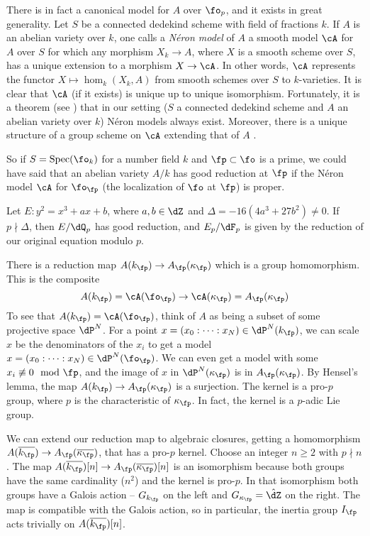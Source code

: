 \documentclass{article}
\begin{document}
There is in fact a canonical model for $A$ over $\fo_p$, and it exists in great 
generality. Let $S$ be a connected dedekind scheme with field of fractions $k$. 
If $A$ is an abelian variety over $k$, one calls a \emph{N\'eron model} of $A$ 
a smooth model $\cA$ for $A$ over $S$ for which any morphism $X_k\to A$, where 
$X$ is a smooth scheme over $S$, has a unique extension to a morphism 
$X\to \cA$. In other words, $\cA$ represents the functor 
$X\mapsto \hom_k(X_k,A)$ from smooth schemes over $S$ to $k$-varieties. It is 
clear that $\cA$ (if it exists) is unique up to unique isomorphism. 
Fortunately, it is a theorem (see \cite[1.4.1]{blr90}) that in our setting 
($S$ a connected dedekind scheme and $A$ an abelian variety over $k$) N\'eron 
models always exist. Moreover, there is a unique structure of a group scheme 
on $\cA$ extending that of $A$ \cite[1.2.6]{blr90}. 

So if $S=\spec(\fo_k)$ for a number field $k$ and $\fp\subset \fo$ is a prime, 
we could have said that an abelian variety $A/k$ has good reduction at $\fp$ 
if the N\'eron model $\cA$ for $\fo_\fp$ (the localization of $\fo$ at 
$\fp$) is proper. 

\begin{example}
Let $E:y^2=x^3+a x+b$, where $a,b\in \dZ$ and $\Delta=-16(4 a^3+27b^2)\ne 0$. 
If $p\nmid \Delta$, then $E/\dQ_p$ has good reduction, and $E_p/\dF_p$ is given 
by the reduction of our original equation modulo $p$. 
\end{example}

There is a reduction map $A(k_\fp)\to A_\fp(\kappa_\fp)$ which is a group 
homomorphism. This is the composite 
\[
  A(k_\fp)=\cA(\fo_\fp) \to \cA(\kappa_\fp) = A_\fp(\kappa_\fp)
\]
To see that $A(k_\fp)=\cA(\fo_\fp)$, think of $A$ as being a subset of some 
projective space $\dP^N$. For a point
$x=(x_0:\cdots:x_N)\in \dP^N(k_\fp)$, we can scale $x$ be the 
denominators of the $x_i$ to get a model 
$x=(x_0:\cdots:x_N)\in\dP^N(\fo_\fp)$. We can even get a model with 
some $x_i\not\equiv 0\mod\fp$, and the image of $x$ in 
$\dP^N(\kappa_\fp)$ is in $A_\fp(\kappa_\fp)$. By Hensel's lemma, the 
map $A(k_\fp) \to A_\fp(\kappa_\fp)$ is a surjection. The kernel is a pro-$p$ 
group, where $p$ is the characteristic of $\kappa_\fp$. In fact, the kernel is 
a $p$-adic Lie group. 

We can extend our reduction map to algebraic closures, getting a homomorphism 
$A(\overline{k_\fp}) \to A_\fp(\overline{\kappa_\fp})$, that has a pro-$p$ 
kernel. Choose an integer $n\geqslant 2$ with $p\nmid n$. The map 
$A(\overline{k_\fp})[n] \to A_\fp(\overline{\kappa_\fp})[n]$ is an isomorphism 
because both groups have the same cardinality ($n^2$) and the kernel is 
pro-$p$. In that isomorphism both groups have a Galois action -- $G_{k_\fp}$ on 
the left and $G_{\kappa_\fp}=\hat\dZ$ on the right. The map is compatible with 
the Galois action, so in particular, the inertia group $I_\fp$ acts trivially 
on $A(\overline{k_\fp})[n]$. 
\end{document}
